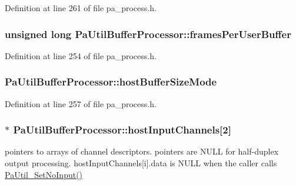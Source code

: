Definition at line 261 of file pa\+\_\+process.\+h.

\subsubsection[{\texorpdfstring{frames\+Per\+User\+Buffer}{framesPerUserBuffer}}]{\setlength{\rightskip}{0pt plus 5cm}unsigned long Pa\+Util\+Buffer\+Processor\+::frames\+Per\+User\+Buffer}\hypertarget{struct_pa_util_buffer_processor_a2a61168f6d216e6aaade39b77452bcb9}{}\label{struct_pa_util_buffer_processor_a2a61168f6d216e6aaade39b77452bcb9}


Definition at line 254 of file pa\+\_\+process.\+h.

\subsubsection[{\texorpdfstring{host\+Buffer\+Size\+Mode}{hostBufferSizeMode}}]{ Pa\+Util\+Buffer\+Processor\+::host\+Buffer\+Size\+Mode}\hypertarget{struct_pa_util_buffer_processor_a71c934464b2671889ec3e20192e6e8d9}{}\label{struct_pa_util_buffer_processor_a71c934464b2671889ec3e20192e6e8d9}


Definition at line 257 of file pa\+\_\+process.\+h.

\subsubsection[{\texorpdfstring{host\+Input\+Channels}{hostInputChannels}}]{$\ast$ Pa\+Util\+Buffer\+Processor\+::host\+Input\+Channels\mbox{[}2\mbox{]}}\hypertarget{struct_pa_util_buffer_processor_a03ea3d7816db14d4fc8ee8bde013d99e}{}\label{struct_pa_util_buffer_processor_a03ea3d7816db14d4fc8ee8bde013d99e}
pointers to arrays of channel descriptors. pointers are N\+U\+LL for half-\/duplex output processing. host\+Input\+Channels\mbox{[}i\mbox{]}.data is N\+U\+LL when the caller calls \hyperlink{pa__process_8c_a3d34489fac9940436629e312524d9f94}{Pa\+Util\+\_\+\+Set\+No\+Input()} 

